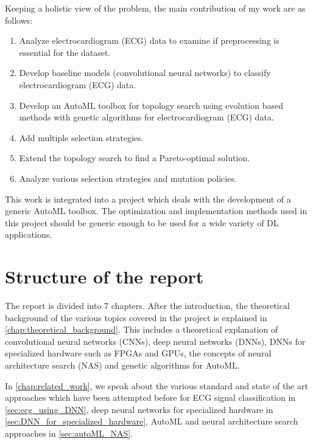 Keeping a holistic view of the problem, the main contribution of my work are as follows:

\begin{enumerate}
    \item Analyze electrocardiogram (ECG) data to examine if preprocessing is essential for the dataset.
    \item Develop baseline models (convolutional neural networks) to classify electrocardiogram (ECG) data.
    \item Develop an AutoML toolbox for topology search using evolution based methods with genetic algorithms for electrocardiogram (ECG) data.
    \item Add multiple selection strategies. 
    \item Extend the topology search to find a Pareto-optimal solution.
    \item Analyze various selection strategies and mutation policies. 
\end{enumerate}

This work is integrated into a project which deals with the development of a generic AutoML toolbox. The optimization and implementation methods used in this project should be generic enough to be used for a wide variety of DL applications.

\section{Structure of the report}

The report is divided into 7 chapters. After the introduction, the theoretical background of the various topics covered in the project is explained in \autoref{chap:theoretical_background}. This includes a theoretical explanation of convolutional neural networks (CNNs), deep neural networks (DNNs), DNNs for specialized hardware such as FPGAs and GPUs, the concepts of neural architecture search (NAS) and genetic algorithms for AutoML.

In \autoref{chap:related_work}, we speak about the various standard and state of the art approaches which have been attempted before for ECG signal classification in \autoref{sec:ecg_using_DNN}, deep neural networks for specialized hardware in \autoref{sec:DNN_for_specialized_hardware}, AutoML and neural architecture search approaches in \autoref{sec:autoML_NAS}.


